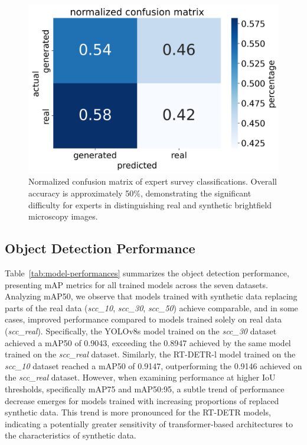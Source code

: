 \begin{figure}[t]
    \centering
    \includegraphics[width=0.75\linewidth]{images/norm_confusion_matrix}
    \caption{Normalized confusion matrix of expert survey classifications. Overall accuracy is approximately 50\%, demonstrating the significant difficulty for experts in distinguishing real and synthetic brightfield microscopy images.}
    \label{fig:conf_matrix}
\end{figure}

\subsection{Object Detection Performance}
\label{subsec:object-detection-performance}
Table~\ref{tab:model-performances} summarizes the object detection performance, presenting mAP metrics for all trained models across the seven datasets.
Analyzing mAP\@50, we observe that models trained with synthetic data replacing parts of the real data (\textit{scc\_10}, \textit{scc\_30}, \textit{scc\_50}) achieve comparable, and in some cases, improved performance compared to models trained solely on real data (\textit{scc\_real}).
Specifically, the YOLOv8s model trained on the \textit{scc\_30} dataset achieved a mAP\@50 of 0.9043, exceeding the 0.8947 achieved by the same model trained on the \textit{scc\_real} dataset.
Similarly, the RT-DETR-l model trained on the \textit{scc\_10} dataset reached a mAP\@50 of 0.9147, outperforming the 0.9146 achieved on the \textit{scc\_real} dataset.
However, when examining performance at higher IoU thresholds, specifically mAP\@75 and mAP\@50:95, a subtle trend of performance decrease emerges for models trained with increasing proportions of replaced synthetic data.
This trend is more pronounced for the RT-DETR models, indicating a potentially greater sensitivity of transformer-based architectures to the characteristics of synthetic data.

